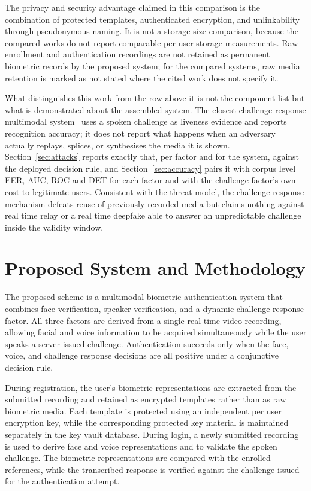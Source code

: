 \documentclass[runningheads]{llncs}
\begin{document}
{{The privacy and security advantage claimed in this comparison is the combination of protected templates, authenticated encryption, and unlinkability through pseudonymous naming. It is not a storage size comparison, because the compared works do not report comparable per user storage measurements. Raw enrollment and authentication recordings are not retained as permanent biometric records by the proposed system; for the compared systems, raw media retention is marked as not stated where the cited work does not specify it.

What distinguishes this work from the row above it is not the component list but what is demonstrated about the assembled system. The closest challenge response multimodal system~\cite{jha2025challenge} uses a spoken challenge as liveness evidence and reports recognition accuracy; it does not report what happens when an adversary actually replays, splices, or synthesises the media it is shown. Section~\ref{sec:attacks} reports exactly that, per factor and for the system, against the deployed decision rule, and Section~\ref{sec:accuracy} pairs it with corpus level EER, AUC, ROC and DET for each factor and with the challenge factor's own cost to legitimate users. Consistent with the threat model, the challenge response mechanism defeats reuse of previously recorded media but claims nothing against real time relay or a real time deepfake able to answer an unpredictable challenge inside the validity window.

}
}

\section{Proposed System and Methodology}\label{sec:proposed}
The proposed scheme is a multimodal biometric authentication system that combines face verification, speaker verification, and a dynamic challenge-response factor. All three factors are derived from a single real time video recording, allowing facial and voice information to be acquired simultaneously while the user speaks a server issued challenge. Authentication succeeds only when the face, voice, and challenge response decisions are all positive under a conjunctive decision rule.

During registration, the user's biometric representations are extracted from the submitted recording and retained as encrypted templates rather than as raw biometric media. Each template is protected using an independent per user encryption key, while the corresponding protected key material is maintained separately in the key vault database. During login, a newly submitted recording is used to derive face and voice representations and to validate the spoken challenge. The biometric representations are compared with the enrolled references, while the transcribed response is verified against the challenge issued for the authentication attempt.
\end{document}
